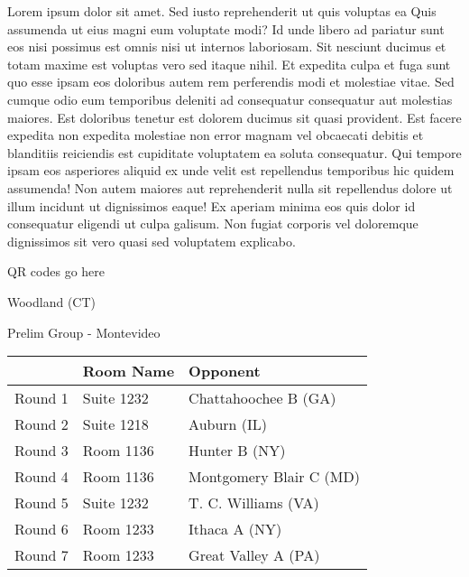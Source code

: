 \documentclass{article}%
\begin{document}
\vspace*{8pt}%
\linebreak%
\newline%
\newline%
Lorem ipsum dolor sit amet. Sed iusto reprehenderit ut quis voluptas ea Quis assumenda ut eius magni eum voluptate modi? Id unde libero ad pariatur sunt eos nisi possimus est omnis nisi ut internos laboriosam. Sit nesciunt ducimus et totam maxime est voluptas vero sed itaque nihil. Et expedita culpa et fuga sunt quo esse ipsam eos doloribus autem rem perferendis modi et molestiae vitae.\newline%
\newline%
Sed cumque odio eum temporibus deleniti ad consequatur consequatur aut molestias maiores. Est doloribus tenetur est dolorem ducimus sit quasi provident. Est facere expedita non expedita molestiae non error magnam vel obcaecati debitis et blanditiis reiciendis est cupiditate voluptatem ea soluta consequatur. Qui tempore ipsam eos asperiores aliquid ex unde velit est repellendus temporibus hic quidem assumenda!\newline%
\newline%
Non autem maiores aut reprehenderit nulla sit repellendus dolore ut illum incidunt ut dignissimos eaque! Ex aperiam minima eos quis dolor id consequatur eligendi ut culpa galisum. Non fugiat corporis vel doloremque dignissimos sit vero quasi sed voluptatem explicabo.\newline%
\newline%
%
\vspace*{30pt}%
\begin{center}%
\begin{Huge}%
QR codes go here%
\end{Huge}%
\end{center}%
\newpage%
%
\begin{center}%
\begin{Huge}%
Woodland (CT)%
\end{Huge}%
\vspace*{8pt}%
\linebreak%
\begin{Large}%
Prelim Group {-} Montevideo%
\end{Large}%
\end{center}%
\begin{tabularx}{\textwidth}{|c|Y|Y|}%
\hline%
&Room Name&Opponent\\%
\hline%
Round 1&Suite 1232&Chattahoochee B (GA)\\%
Round 2&Suite 1218&Auburn (IL)\\%
Round 3&Room 1136&Hunter B (NY)\\%
Round 4&Room 1136&Montgomery Blair C (MD)\\%
Round 5&Suite 1232&T. C. Williams (VA)\\%
Round 6&Room 1233&Ithaca A (NY)\\%
Round 7&Room 1233&Great Valley A (PA)\\%
\hline%
\end{tabularx}%
\end{document}
